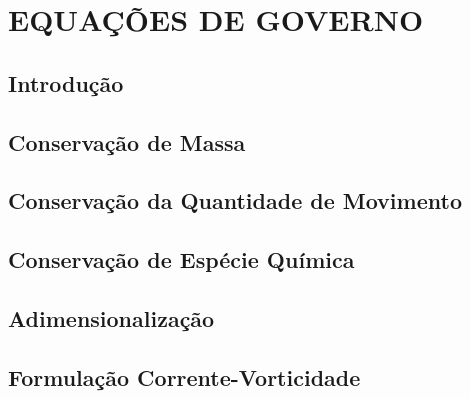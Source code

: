 \chapter{\textbf{EQUAÇÕES DE GOVERNO}}
\label{eqgov}

\section{\textbf{Introdução}} 

\label{intro equacoes de governo}

\section{\textbf{Conservação de Massa}} 
\label{conservacao massa}



\section{\textbf{Conservação da Quantidade de Movimento}} 
\label{conservacao movimento}



\section{\textbf{Conservação de Espécie Química}} 
\label{conservacao especie}



\section{\textbf{Adimensionalização}} 
\label{adimensionalizacao}



\section{\textbf{Formulação Corrente-Vorticidade}} 
\label{corrente vorticidade}




